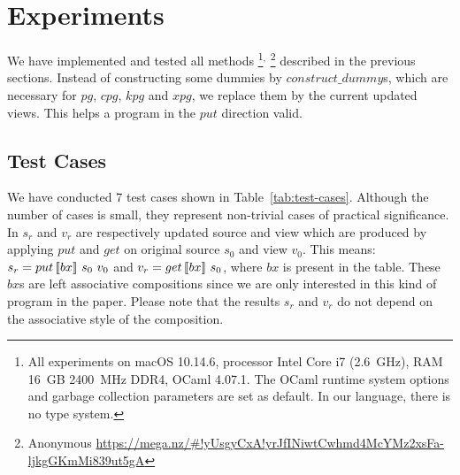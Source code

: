 \section{Experiments} \label{sect:experiments}

We have implemented and tested all methods%
%
\footnote{All experiments on macOS 10.14.6, processor Intel Core i7 (2.6~GHz), RAM 16~GB 2400~MHz DDR4, OCaml 4.07.1. The OCaml runtime system options and garbage collection parameters are set as default. In our language, there is no type system.}$^,$%
%
\footnote{Anonymous \url{https://mega.nz/\#!yUsgyCxA!yrJfINiwtCwhmd4McYMz2xsFa-ljkgGKmMi839ut5gA}}
%
described in the previous sections.
Instead of constructing some dummies by $construct\_dummy$s, which are necessary for $pg$, $cpg$, $kpg$ and $xpg$, we replace them by the current updated views. This helps a program in the $put$ direction valid.

\subsection{Test Cases}

We have conducted 7 test cases shown in Table~\ref{tab:test-cases}. Although the number of cases is small, 
they represent non-trivial cases of practical significance.
In $s_r$ and $v_r$ are respectively updated source and view which are produced by applying $put$ and $get$ on original source $s_0$ and view $v_0$. This means: $s_r = put \, [\![bx]\!] \ s_0 \ v_0$ and $v_r = get \, [\![bx]\!] \ s_0$, where $bx$ is present in the table. These $bx$s are left associative compositions since we are only interested in this kind of program in the paper. Please note that the results $s_r$ and $v_r$ do not depend on the associative style of the composition.

